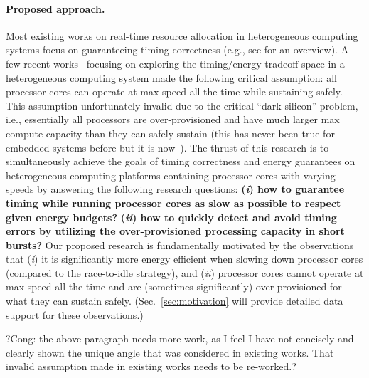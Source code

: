 \paragraph{Proposed approach.} 
Most existing works on real-time resource allocation in heterogeneous computing systems focus on guaranteeing timing correctness (e.g., see \cite{raravi2014task, raravi2013assigning, niemeier2011partitioned} for an overview). %
 A few recent works~\cite{?} focusing on exploring the timing/energy tradeoff space in a heterogeneous computing system made the following critical assumption: all processor cores can operate at max speed all the time while sustaining safely. %
  This assumption unfortunately invalid due to the critical ``dark silicon'' problem, i.e., essentially all processors are over-provisioned and have much larger max compute capacity than they can safely sustain (this has never been true for embedded systems before but it is now~\cite{?}). The thrust of this research is to simultaneously achieve the goals of timing correctness and energy guarantees on heterogeneous computing platforms containing processor cores with varying speeds by answering the following research questions: \textbf{(\textit{i}) how to guarantee timing while running processor cores as slow as possible to respect given energy budgets?}   \textbf{(\textit{ii}) how to quickly detect and avoid timing errors by utilizing the over-provisioned processing capacity in short bursts?} Our proposed research is fundamentally motivated by the observations that (\textit{i}) it is significantly more energy efficient when slowing down processor cores (compared to the race-to-idle strategy), and (\textit{ii}) processor cores cannot operate at max speed all the time and are (sometimes significantly) over-provisioned for what they can sustain safely. (Sec.~\ref{sec:motivation} will provide detailed data support for these observations.) 
  
  ?Cong: the above paragraph needs more work, as I feel I have not concisely and clearly shown the unique angle that was considered in existing works. That invalid assumption made in existing works needs to be re-worked.?

